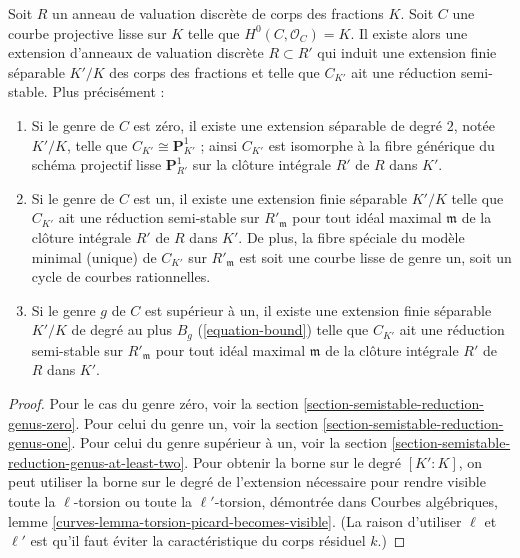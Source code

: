 \begin{theorem}
\label{theorem-semistable-reduction}
\begin{reference}
\cite[Corollary 2.7]{DM}
\end{reference}
Soit $R$ un anneau de valuation discrète de corps des fractions $K$.
Soit $C$ une courbe projective lisse sur $K$ telle que
$H^0(C,\mathcal{O}_C)=K$. Il existe alors une extension d'anneaux de
valuation discrète $R\subset R'$ qui induit une extension finie séparable
$K'/K$ des corps des fractions et telle que $C_{K'}$ ait une réduction
semi-stable. Plus précisément :
\begin{enumerate}
\item Si le genre de $C$ est zéro, il existe une extension séparable de
degré $2$, notée $K'/K$, telle que $C_{K'}\cong\mathbf{P}^1_{K'}$ ; ainsi
$C_{K'}$ est isomorphe à la fibre générique du schéma projectif lisse
$\mathbf{P}^1_{R'}$ sur la clôture intégrale $R'$ de $R$ dans $K'$.
\item Si le genre de $C$ est un, il existe une extension finie séparable
$K'/K$ telle que $C_{K'}$ ait une réduction semi-stable sur
$R'_\mathfrak m$ pour tout idéal maximal $\mathfrak m$ de la clôture
intégrale $R'$ de $R$ dans $K'$. De plus, la fibre spéciale du modèle
minimal (unique) de $C_{K'}$ sur $R'_\mathfrak m$ est soit une courbe
lisse de genre un, soit un cycle de courbes rationnelles.
\item Si le genre $g$ de $C$ est supérieur à un, il existe une extension
finie séparable $K'/K$ de degré au plus $B_g$ (\ref{equation-bound}) telle
que $C_{K'}$ ait une réduction semi-stable sur $R'_\mathfrak m$ pour
tout idéal maximal $\mathfrak m$ de la clôture intégrale $R'$ de $R$ dans
$K'$.
\end{enumerate}
\end{theorem}

\begin{proof}
Pour le cas du genre zéro, voir la section
\ref{section-semistable-reduction-genus-zero}. Pour celui du genre un, voir
la section \ref{section-semistable-reduction-genus-one}. Pour celui du
genre supérieur à un, voir la section
\ref{section-semistable-reduction-genus-at-least-two}. Pour obtenir la borne
sur le degré $[K':K]$, on peut utiliser la borne sur le degré de l'extension
nécessaire pour rendre visible toute la $\ell$-torsion ou toute la
$\ell'$-torsion, démontrée dans Courbes algébriques, lemme
\ref{curves-lemma-torsion-picard-becomes-visible}. (La raison d'utiliser
$\ell$ et $\ell'$ est qu'il faut éviter la caractéristique du corps
résiduel $k$.)
\end{proof}

